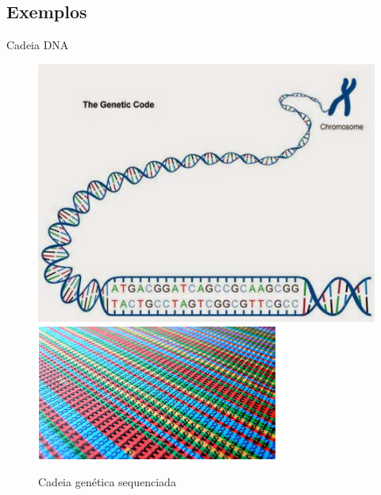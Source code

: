 \documentclass{beamer}
\begin{document}
\subsection{Exemplos}
    \begin{frame}{Cadeia DNA}
        \begin{figure}[!h]
            \centering
            \includegraphics[scale=0.35]{dnacod.jpg} \quad
            \includegraphics[scale=0.35]{Imagem2.png}
            \caption{Cadeia genética sequenciada}
            \label{Rotulo}
        \end{figure}
   \end{frame}
\end{document}
